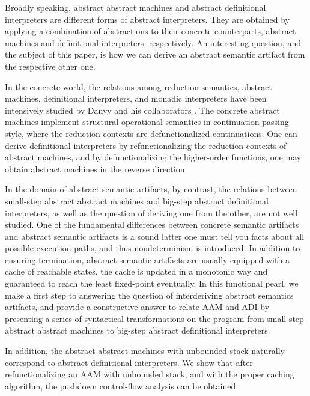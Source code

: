 \documentclass[acmsmall, review]{acmart}\settopmatter{}
\begin{document}
Broadly speaking, abstract abstract machines and abstract definitional interpreters are
different forms of abstract interpreters. They are obtained by applying a combination 
of abstractions to their concrete counterparts, abstract machines and definitional 
interpreters, respectively. An interesting question, and the subject of this paper, is 
how we can derive an abstract semantic artifact from the respective other one.

In the concrete world, the relations among reduction semantics, abstract machines,
definitional interpreters, and monadic interpreters have been intensively studied by
Danvy and his collaborators \cite{Ager:2003:FCE:888251.888254, Danvy:2001:DW:773184.773202,
danvy2004refocusing, Danvy:2008:DIP:1411204.1411206, AGER2004223, ager2005functional, 
Danvy:2006:RW:2171265.2171268, danvy2009towards, biernacka2009towards}.
The concrete abstract machines implement structural operational semantics in 
continuation-passing style, where the reduction contexts are defunctionalized continuations.
One can derive definitional interpreters by refunctionalizing the reduction contexts of 
abstract machines, and by defunctionalizing the higher-order functions, one may obtain 
abstract machines in the reverse direction.

In the domain of abstract semantic artifacts, by contrast, the relations between small-step
abstract abstract machines and big-step abstract definitional interpreters, as well as the 
question of deriving one from the other, are not well studied.
One of the fundamental differences between concrete semantic artifacts and abstract semantic
artifacts is a sound latter one must tell you facts about all possible execution paths, and 
thus nondeterminism is introduced. In addition to ensuring termination, abstract semantic
artifacts are usually equipped with a cache of reachable states, the cache is
updated in a monotonic way and guaranteed to reach the least fixed-point eventually.
In this functional pearl, we make a first step to answering the question of interderiving
abstract semantics artifacts, and provide a constructive answer to relate AAM and ADI
by presenting a series of syntactical transformations on the program from small-step 
abstract abstract machines to big-step abstract definitional interpreters.

In addition, the abstract abstract machines with unbounded stack naturally correspond
to abstract definitional interpreters. We show that after refunctionalizing an AAM with 
unbounded stack, and with the proper caching algorithm, the pushdown control-flow analysis 
can be obtained.
\end{document}
